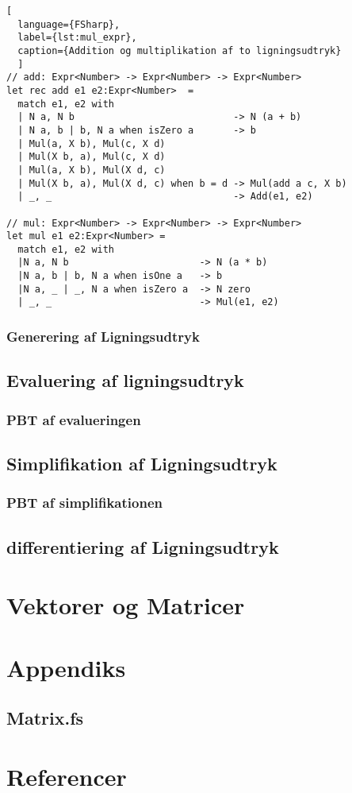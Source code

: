 \documentclass{article}
\begin{document}
\begin{lstlisting}[
  language={FSharp}, 
  label={lst:mul_expr}, 
  caption={Addition og multiplikation af to ligningsudtryk}
  ]
// add: Expr<Number> -> Expr<Number> -> Expr<Number>
let rec add e1 e2:Expr<Number>  =
  match e1, e2 with
  | N a, N b                            -> N (a + b)
  | N a, b | b, N a when isZero a       -> b
  | Mul(a, X b), Mul(c, X d) 
  | Mul(X b, a), Mul(c, X d)
  | Mul(a, X b), Mul(X d, c) 
  | Mul(X b, a), Mul(X d, c) when b = d -> Mul(add a c, X b)  
  | _, _                                -> Add(e1, e2)

// mul: Expr<Number> -> Expr<Number> -> Expr<Number>
let mul e1 e2:Expr<Number> =
  match e1, e2 with
  |N a, N b                       -> N (a * b)
  |N a, b | b, N a when isOne a   -> b
  |N a, _ | _, N a when isZero a  -> N zero
  | _, _                          -> Mul(e1, e2)
\end{lstlisting}


\subsubsection{Generering af Ligningsudtryk}\label{sec:expression_generation}
    
\subsection{Evaluering af ligningsudtryk}
\subsubsection{PBT af evalueringen} %
\subsection{Simplifikation af Ligningsudtryk} \label{sec:simplification_expression}
\subsubsection{PBT af simplifikationen} %

\subsection{differentiering af Ligningsudtryk}

\section{Vektorer og Matricer}


\section{Appendiks}
\subsection{Matrix.fs} \label{sec:matrix.fs}

\section{Referencer}
\printbibliography
\end{document}
